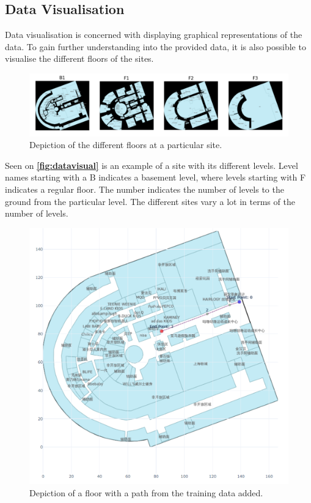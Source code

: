 \subsection{Data Visualisation} 
Data visualisation is concerned with displaying graphical representations of the data. To gain further understanding into the provided data, it is also possible to visualise the different floors of the sites. 

\begin{figure}[H]
    \centering
    \includegraphics[scale=.31]{Images/ProblemAnalysis/datavisual.png}
    \caption{Depiction of the different floors at a particular site.}
    \label{fig:datavisual}
\end{figure}

Seen on \textbf{\autoref{fig:datavisual}} is an example of a site with its different levels. Level names starting with a B indicates a basement level, where levels starting with F indicates a regular floor. The number indicates the number of levels to the ground from the particular level. The different sites vary a lot in terms of the number of levels.

\begin{figure}[H]
    \centering
    \includegraphics[scale=.37]{Images/ProblemAnalysis/datapath.png}
    \caption{Depiction of a floor with a path from the training data added.}
    \label{fig:datapath}
\end{figure}


